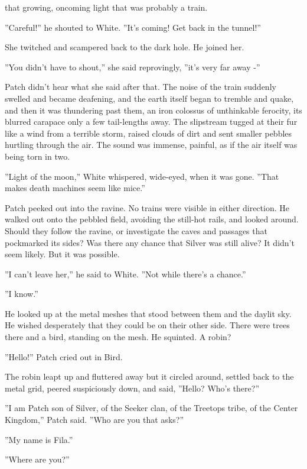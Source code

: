 \documentclass[11pt]{article}
\begin{document}
 that growing, oncoming light %
 that was probably a train.\par
 ''Careful!'' he shouted to White. ''It's coming! Get back in the tunnel!''\par
 She twitched and scampered back to the dark hole. He joined her.\par
 ''You didn't have to shout,'' she said reprovingly, ''it's very far away -''\par
 Patch didn't hear what she said after that. The noise of the train suddenly swelled and became deafening, and the earth itself began to tremble and quake, and then it was thundering past them, an iron colossus of unthinkable ferocity, its blurred carapace only a few tail-lengths away. The slipstream tugged at their fur like a wind from a terrible storm, raised clouds of dirt and sent smaller pebbles hurtling through the air. The sound was immense, painful, as if the air itself was being torn in two.\par
 ''Light of the moon,'' White whispered, wide-eyed, when it was gone. ''That makes death machines seem like mice.''\par
 Patch peeked out into the ravine. No trains were visible in either direction. He walked out onto the pebbled field, avoiding the still-hot rails, and looked around. Should they follow the ravine, or investigate the caves and passages that pockmarked its sides? Was there any chance that Silver was still alive? It didn't seem likely. But it was possible.\par
 ''I can't leave her,'' he said to White. ''Not while there's a chance.''\par
 ''I know.''\par
 He looked up at the metal meshes that stood between them and the daylit sky. He wished desperately that they could be on their other side. There were trees there %
 and a bird, standing on the mesh. He squinted. A robin?\par
 ''Hello!'' Patch cried out in Bird.\par
 The robin leapt up and fluttered away %
 but it circled around, settled back to the metal grid, peered suspiciously down, and said, ''Hello? Who's there?''\par
 ''I am Patch son of Silver, of the Seeker clan, of the Treetops tribe, of the Center Kingdom,'' Patch said. ''Who are you that asks?''\par
 ''My name is Fila.''\par
 ''Where are you?''\par
\end{document}
